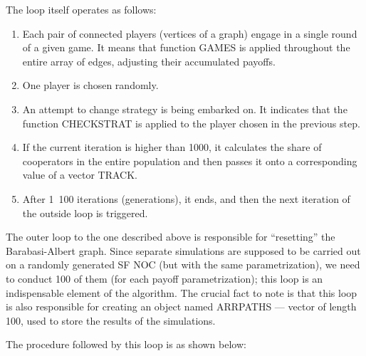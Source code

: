\documentclass[english, twoside, 12pt, a4paper]{article}
\theoremstyle{definition}
\theoremstyle{plain}
\theoremstyle{remark}
\begin{document}
The loop itself operates as follows:

\begin{enumerate}[noitemsep]
  \item Each pair of connected players (vertices of a graph) engage in a single round of a given game. It means that function GAMES is applied throughout the entire array of edges, adjusting their accumulated payoffs.
  \item One player is chosen randomly.
  \item An attempt to change strategy is being embarked on. It indicates that the function CHECKSTRAT is applied to the player chosen in the previous step.
  \item If the current iteration is higher than 1000, it calculates the share of cooperators in the entire population and then passes it onto a corresponding value of a vector TRACK.
  \item After 1~100 iterations (generations), it ends, and then the next iteration of the outside loop is triggered.
\end{enumerate}

The outer loop to the one described above is responsible for \enquote{resetting} the Barabasi-Albert graph. Since separate simulations are supposed to be carried out on a randomly generated SF NOC (but with the same parametrization), we need to conduct 100 of them (for each payoff parametrization); this loop is an indispensable element of the algorithm. The crucial fact to note is that this loop is also responsible for creating an object named ARRPATHS --- vector of length 100, used to store the results of the simulations.

The procedure followed by this loop is as shown below:
\end{document}
